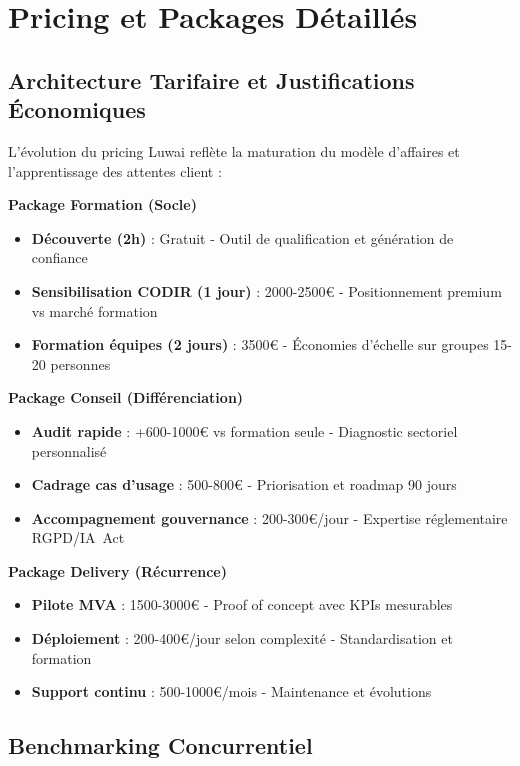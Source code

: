 \section{Pricing et Packages Détaillés}

\subsection{Architecture Tarifaire et Justifications Économiques}

L'évolution du pricing Luwai reflète la maturation du modèle d'affaires et l'apprentissage des attentes client :

\textbf{Package Formation (Socle)}
\begin{itemize}
    \item \textbf{Découverte (2h)} : Gratuit - Outil de qualification et génération de confiance
    \item \textbf{Sensibilisation CODIR (1 jour)} : 2000-2500€ - Positionnement premium vs marché formation
    \item \textbf{Formation équipes (2 jours)} : 3500€ - Économies d'échelle sur groupes 15-20 personnes
\end{itemize}

\textbf{Package Conseil (Différenciation)}
\begin{itemize}
    \item \textbf{Audit rapide} : +600-1000€ vs formation seule - Diagnostic sectoriel personnalisé
    \item \textbf{Cadrage cas d'usage} : 500-800€ - Priorisation et roadmap 90 jours
    \item \textbf{Accompagnement gouvernance} : 200-300€/jour - Expertise réglementaire RGPD/IA~Act
\end{itemize}

\textbf{Package Delivery (Récurrence)}
\begin{itemize}
    \item \textbf{Pilote MVA} : 1500-3000€ - Proof of concept avec KPIs mesurables
    \item \textbf{Déploiement} : 200-400€/jour selon complexité - Standardisation et formation
    \item \textbf{Support continu} : 500-1000€/mois - Maintenance et évolutions
\end{itemize}

\subsection{Benchmarking Concurrentiel}

